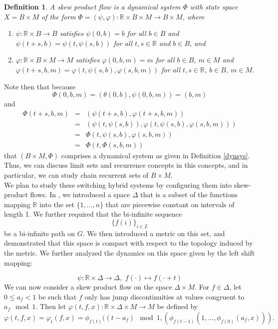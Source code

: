 \documentclass[11pt]{article}
\newtheorem{defn}[thm]{Definition}
\begin{document}
\begin{defn}\label{skewproduct}
A skew product flow is a dynamical system $\Phi$ with state space $X=B\times M$ of the form $\Phi=(\psi,\varphi):\mathbb{R}\times B\times M\rightarrow B\times M$, where 
\begin{enumerate}
\item $\psi:\mathbb{R}\times B\rightarrow B$ satisfies $\psi(0,b)=b$ for all $b\in B$ and $\psi(t+s,b)=\psi(t,\psi(s,b))$ for all $t,s\in\mathbb{R}$ and $b\in B$, and 
\item$\varphi:\mathbb{R}\times B\times M\rightarrow M$ satisfies $\varphi(0,b,m)=m$ for all $b\in B$, $m\in M$ and $\varphi(t+s,b,m)=\varphi(t,\psi(s,b),\varphi(s,b,m))$ for all $t,s\in\mathbb{R}$, $b\in B$, $m\in M$. 
\end{enumerate}
\end{defn} 
\noindent Note then that because $$\Phi(0,b,m)=(\theta(0,b), \psi(0,b,m))=(b,m)$$ and 
\begin{eqnarray*}
\Phi(t+s,b,m)&=&(\psi(t+s,b),\varphi(t+s,b,m))\\
&=&(\psi(t,\psi(s,b)),\varphi(t,\psi(s,b),\varphi(s,b,m)))\\
&=&\Phi(t,\psi(s,b),\varphi(s,b,m))\\
&=&\Phi(t,\Phi(s,b,m))
\end{eqnarray*}
that $(B\times M, \Phi)$ comprises a dynamical system as given in Definition \ref{dynsys}.  Thus, we can discuss limit sets and recurrence concepts in this concepts, and in particular, we can study chain recurrent sets of $B\times M$. \\
\indent We plan to study these switching hybrid systems by configuring them into skew-product flows.  In \cite{Ayers2013}, we introduced a space $\Delta$ that is a subset of the functions mapping $\mathbb{R}$ into the set $\{1,\ldots,n\}$ that are piecewise constant on intervals of length 1. We further required that the bi-infinite sequence 
$$\{f(i)\}_{i\in\mathbb{Z}}$$ 
be a bi-infinite path on $G$.  We then introduced a metric on this set, and demonstrated that this space is compact with respect to the topology induced by the metric.  We further analyzed the dynamics on this space given by the left shift mapping:

$$\psi:\mathbb{R}\times\Delta\rightarrow\Delta,\,\, f(\cdot)\mapsto f(\cdot+ t)$$
We can now consider a skew product flow on the space $\Delta\times M$.  For $f \in \Delta$, let $0\leq a_f<1$ be such that $f$ only has jump discontinuities at values congruent to $a_f\mod 1$.  Then let $\varphi(t,f,x):\mathbb{R} \times \Delta\times M \rightarrow M$ be defined by
\begin{equation}\label{varphi}
\varphi (t,f,x) = \varphi_t(f,x)= \phi_{f(t)}((t-a_f)\mod1,(\phi_{f(t-1)}(1,...,\phi_{f(0)}(a_f,x))). 
\end{equation}
\end{document}
